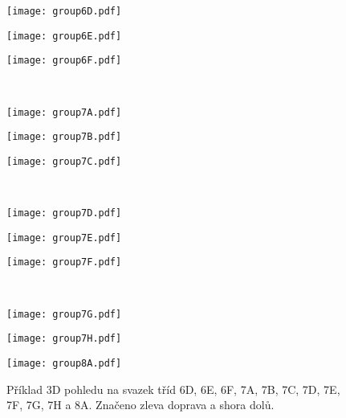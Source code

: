 \begin{figure}[htps]
\centering
\begin{minipage}[c]{0.325\textwidth}
\texttt{[image: group6D.pdf]}
\end{minipage}
\begin{minipage}[c]{0.325\textwidth}
\texttt{[image: group6E.pdf]}
\end{minipage}
\begin{minipage}[c]{0.325\textwidth}
\texttt{[image: group6F.pdf]}
\end{minipage}\\

\begin{minipage}[c]{0.325\textwidth}
\texttt{[image: group7A.pdf]}
\end{minipage}
\begin{minipage}[c]{0.325\textwidth}
\texttt{[image: group7B.pdf]}
\end{minipage}
\begin{minipage}[c]{0.325\textwidth}
\texttt{[image: group7C.pdf]}
\end{minipage}\\

\begin{minipage}[c]{0.325\textwidth}
\texttt{[image: group7D.pdf]}
\end{minipage}
\begin{minipage}[c]{0.325\textwidth}
\texttt{[image: group7E.pdf]}
\end{minipage}
\begin{minipage}[c]{0.325\textwidth}
\texttt{[image: group7F.pdf]}
\end{minipage}\\

\begin{minipage}[c]{0.325\textwidth}
\texttt{[image: group7G.pdf]}
\end{minipage}
\begin{minipage}[c]{0.325\textwidth}
\texttt{[image: group7H.pdf]}
\end{minipage}
\begin{minipage}[c]{0.325\textwidth}
\texttt{[image: group8A.pdf]}
\end{minipage}

\caption[Svazky třídy 6D-8A.]{Příklad 3D pohledu na svazek tříd 6D, 6E, 6F, 7A, 7B, 7C, 7D, 7E, 7F, 7G, 7H a 8A. Značeno zleva doprava a shora dolů.}
\label{fig:modelClass3D3}
\end{figure}


